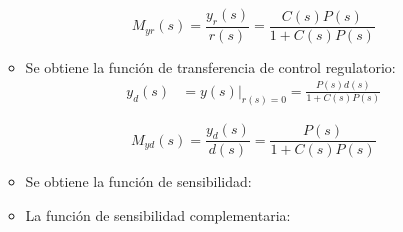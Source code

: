 \begin{itemize}
\begin{itemize}
      \begin{equation*}
        \tag{Función de Transferencia del servo control}
        M_{yr}(s) = \frac{y_r(s)}{r(s)} = \frac{C(s) P(s)}{1 + C(s) P(s)}
      \end{equation*}

      \item
      Se obtiene la función de transferencia de control regulatorio:
      \begin{align*}
        y_{d}(s) &= y(s)|_{r(s)=0} = \frac{P(s) d(s) }{1 + C(s) P(s)}
      \end{align*}

      \begin{equation*}
        \tag{Función de Transferencia del control regulatorio}
        M_{yd}(s) = \frac{y_d(s)}{d(s)} = \frac{P(s)}{1 + C(s) P(s)}
      \end{equation*}

      \item
      Se obtiene la función de sensibilidad:

      \item
      La función de sensibilidad complementaria:
    \end{itemize}
  \end{itemize}



